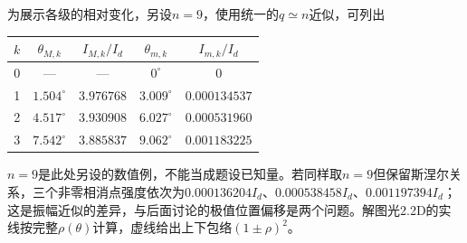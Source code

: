 \documentclass[UTF8,fontset=fandol,a4paper,11pt]{ctexart}
\begin{document}
为展示各级的相对变化，另设$n=9$，使用统一的$q\simeq n$近似，可列出
\begin{center}
\begin{tabular}{c c c c c}
\toprule
$k$ & $\theta_{M,k}$ & $I_{M,k}/I_d$ & $\theta_{m,k}$ & $I_{m,k}/I_d$\\
\midrule
0 & --- & --- & $0^\circ$ & $0$\\
1 & $1.504^\circ$ & $3.976768$ & $3.009^\circ$ & $0.000134537$\\
2 & $4.517^\circ$ & $3.930908$ & $6.027^\circ$ & $0.000531960$\\
3 & $7.542^\circ$ & $3.885837$ & $9.062^\circ$ & $0.001183225$\\
\bottomrule
\end{tabular}
\end{center}
$n=9$是此处另设的数值例，不能当成题设已知量。若同样取$n=9$但保留斯涅尔关系，三个非零相消点强度依次为$0.000136204I_d$、$0.000538458I_d$、$0.001197394I_d$；这是振幅近似的差异，与后面讨论的极值位置偏移是两个问题。解图光2.2D的实线按完整$\rho(\theta)$计算，虚线给出上下包络$(1\pm\rho)^2$。
\end{document}
